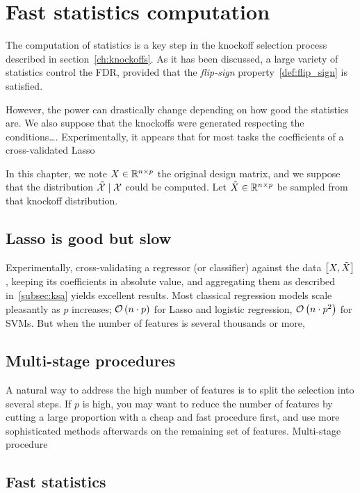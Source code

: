\chapter{Fast statistics computation}\label{ch:fsc}

The computation of statistics is a key step in the knockoff selection process described in section~\ref{ch:knockoffs}.
As it has been discussed, a large variety of statistics control the FDR,
provided that the \textit{flip-sign} property~\ref{def:flip_sign} is satisfied.

However, the power can drastically change depending on how good the statistics are.
We also suppose that the knockoffs were generated respecting the conditions\dots.
Experimentally, it appears that for most tasks the coefficients of a cross-validated Lasso

In this chapter, we note $X \in \mathbb{R}^{n \times p}$ the original design matrix,
and we suppose that the distribution $\tilde{\mathcal{X}} \mid \mathcal{X}$ could be computed.
Let $\tilde{X} \in \mathbb{R}^{n \times p}$ be sampled from that knockoff distribution.

\section{Lasso is good but slow}\label{sec:}

Experimentally, cross-validating a regressor (or classifier) against the data $\big[ X, \tilde{X} \big]$,
keeping its coefficients in absolute value,
and aggregating them as described in~\ref{subsec:ksa} yields excellent results.
Most classical regression models scale pleasantly as $p$ increases;
$\mathcal{O}\left( n \cdot p \right)$ for Lasso and logistic regression,
$\mathcal{O}\left( n \cdot p^2 \right)$ for SVMs.
But when the number of features is several thousands or more,

\section{Multi-stage procedures}\label{sec:multi_stage}

A natural way to address the high number of features is to split the selection into several steps.
If $p$ is high,
you may want to reduce the number of features by cutting a large proportion with a cheap and fast procedure first,
and use more sophisticated methods afterwards on the remaining set of features.
Multi-stage procedure~\cite{multi_stage_fdr}

\section{Fast statistics}\label{sec:a}

